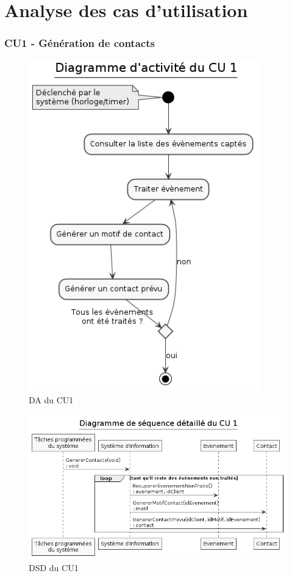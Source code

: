\part{Analyse des cas d'utilisation}
\setcounter{section}{0}

\section{CU1 - Génération de contacts}

\begin{figure}[H]
\centering
\includegraphics[width=10cm]{figures/DA_CU1.png}
\caption{DA du CU1}
\end{figure}

\begin{figure}[H]
\centering
\includegraphics[width=\textwidth]{figures/DSD_CU1.png}
\caption{DSD du CU1}
\end{figure}

